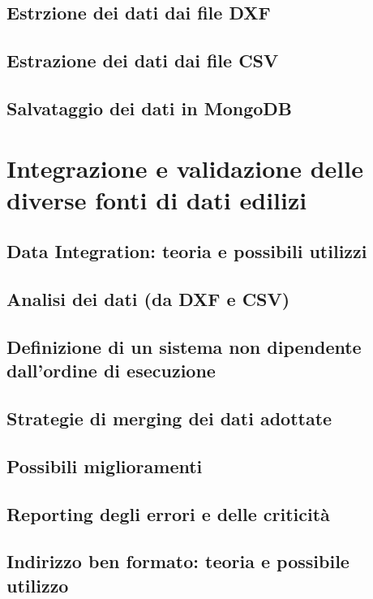 \documentclass[12pt]{report}
\begin{document}
\section{Estrzione dei dati dai file DXF}



\section{Estrazione dei dati dai file CSV}

\section{Salvataggio dei dati in MongoDB}


\chapter{Integrazione e validazione delle diverse fonti di dati edilizi}
\label{cap2}

\section{Data Integration: teoria e possibili utilizzi}

\section{Analisi dei dati (da DXF e CSV)}

\section{Definizione di un sistema non dipendente dall'ordine di esecuzione}

\section{Strategie di merging dei dati adottate}

\section{Possibili miglioramenti}

\section{Reporting degli errori e delle criticità}

\section{Indirizzo ben formato: teoria e possibile utilizzo}
\end{document}
